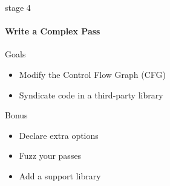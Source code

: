 \documentclass[14pt]{beamer}
\begin{document}
    \begin{frame}{stage 4}

        \framesubtitle{Write a Complex Pass}

        \begin{block}{Goals}
            \begin{itemize}
                \item Modify the Control Flow Graph (CFG)
                \item Syndicate code in a third-party library
            \end{itemize}

        \end{block}

        \begin{alertblock}{Bonus}
            \begin{itemize}
                \item Declare extra options
                \item Fuzz your passes
                \item Add a support library
            \end{itemize}
        \end{alertblock}

    \end{frame}
\end{document}
